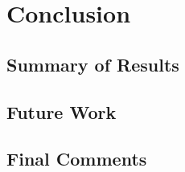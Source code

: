 \chapter{Conclusion}\label{Conclusion}

\section{Summary of Results}


\section{Future Work}

\section{Final Comments}
